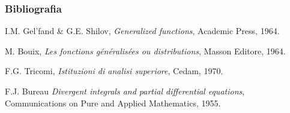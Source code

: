 \documentclass[11pt]{beamer}
\begin{document}
\begin{frame}
\frametitle{Bibliografia}
\begin{thebibliography}{4}


I.M. Gel'fand \& G.E. Shilov, \emph{Generalized functions}, Academic Press, 1964.


M. Bouix, \emph{Les fonctions g\'{e}n\'{e}ralis\'{e}es ou distributions}, Masson Editore, 1964.


F.G. Tricomi, \emph{Istituzioni di analisi superiore}, Cedam, 1970.



F.J. Bureau \emph{Divergent integrals and partial differential equations}, Communications on Pure and Applied Mathematics, 1955.
\end{thebibliography}
\end{frame}
\end{document}
